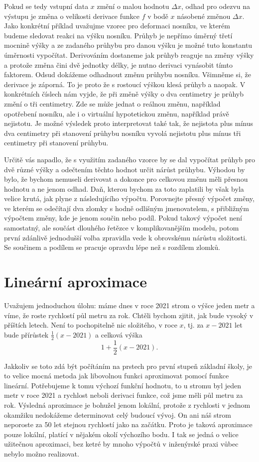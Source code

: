 \documentclass[12pt]{article}
\begin{document}
Pokud se tedy vstupní data $x$ změní o malou hodnotu $\Delta x$, odhad pro odezvu na výstupu je změna o velikosti derivace funkce $f$ v bodě $x$ násobené změnou $\Delta x$. Jako konkrétní příklad uvažujme vzorec pro deformaci nosníku, ve kterém budeme sledovat reakci na výšku nosníku. Průhyb je nepřímo úměrný třetí mocnině výšky a ze zadaného průhybu pro danou výšku je možné tuto konstantu úměrnosti vypočítat. Derivováním dostaneme jak průhyb reaguje na změny výšky a protože změna čini dvě jednotky délky, je nutno derivaci vynásobit tímto faktorem. Odsud dokážeme odhadnout změnu průhybu nosníku. Všimněme si, že derivace je záporná. To je proto že s rostoucí výškou klesá průhyb a naopak. V konkrétních číslech nám vyjde, že při změně výšky o dva centimetry je průhyb změní o tři centimetry. Zde se může jednat o reálnou změnu, například opotřebení nosníku, ale i o virtuální hypotetickou změnu, například právě nejistotu. Je možné výsledek proto interpretovat také tak, že nejistota plus mínus dva centimetry při stanovení průhybu nosníku vyvolá nejistotu plus mínus tři centimetry při stanovení průhybu.

Určitě vás napadlo, že s využitím zadaného vzorce by se dal vypočítat průhyb pro dvě různé výšky a odečtením těchto hodnot určit nárůst průhybu. Výhodou by bylo, že bychom nemuseli derivovat a dokonce pro celkovou změnu měli přesnou hodnotu a ne jenom odhad. Daň, kterou bychom za toto zaplatili by však byla velice krutá, jak plyne z následujícího výpočtu. Porovnejte přesný výpočet změny, ve kterém se odečítají dva zlomky s hodně odlišným jmenovatelem, s přibližným výpočtem změny, kde je jenom součin nebo podíl. Pokud takový výpočet není samostatný, ale součást dlouhého řetězce v komplikovanějším modelu, potom první zdánlivě jednodušší volba zpravidla vede k obrovskému nárůstu složitosti. Se součinem a podílem se pracuje opravdu lépe než s rozdílem zlomků. 

\section*{Lineární aproximace}

Uvažujem jednoduchou úlohu: máme dnes v roce 2021 strom o výšce jeden metr a víme, že roste rychlostí půl metru za rok. Chtěli bychom zjitit, jak bude vysoký v příštích letech. Není to pochopitelně nic složitého, v roce $x$, tj. za $x-2021$ let bude přírůstek $\frac 12 (x-2021)$ a celková výška $$1+\frac 12 (x-2021).$$

Jakkoliv se toto zdá být počítáním na prstech pro první stupeň základní školy, je to velice mocná metoda jak libovolnou funkci aproximovat pomocí funkce lineární. Potřebujeme k tomu výchozí funkční hodnotu, to u stromu byl jeden metr v roce 2021 a rychlost neboli derivaci funkce, což jsme měli půl metru za rok. Výsledná aproximace je bohužel jenom lokální, protože z rychlosti v jednom okamžiku nedokážeme determinovat celý budoucí vývoj. On ani náš strom neporoste za 50 let stejnou rychlostí jako na začátku. Proto je taková aproximace pouze lokální, platící v nějakém okolí výchozího bodu. I tak se jedná o velice užitečnou aproximaci, bez ketré by mnoho výpočtů v inženýrské praxi vůbec nebylo možno realizovat.
\end{document}
